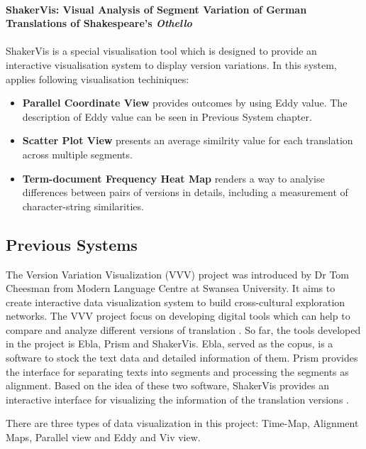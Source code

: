 \paragraph{ShakerVis: Visual Analysis of Segment Variation of German Translations of Shakespeare’s \emph{Othello}}
\paragraph[]{} ShakerVis \cite{Geng2015} is a special visualisation tool which is designed to provide an interactive visualisation system to display version variations. In this system, \cite{Geng2015} applies following visualisation techiniques:

\begin{itemize}
	\item \textbf{Parallel Coordinate View} provides outcomes by using Eddy value. The description of Eddy value can be seen in Previous System chapter.
	\item \textbf{Scatter Plot View} presents an average similrity value for each translation across multiple segments.
	\item \textbf{Term-document Frequency Heat Map} renders a way to analyise differences between pairs of versions in details, including a measurement of character-string similarities.

\end{itemize}

\subsection{Previous Systems}

The Version Variation Visualization (VVV) project was introduced by Dr Tom Cheesman from Modern Language Centre at Swansea University. It aims to create interactive data visualization system to build cross-cultural exploration networks. The VVV project focus on developing digital tools which can help to compare and analyze different versions of translation \cite{Cheesman2012}. So far, the tools developed in the project is Ebla, Prism and ShakerVis. Ebla, served as the copus, is a software to stock the text data and detailed information of them. Prism provides the interface for separating texts into segments and processing the segments as alignment. Based on the idea of these two software, ShakerVis provides an interactive interface for visualizing the information of the translation versions \cite{Geng2015}.

There are three types of data visualization in this project: Time-Map, Alignment Maps, Parallel view and Eddy and Viv view. 


